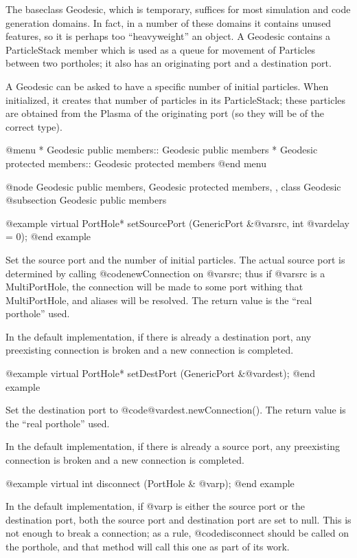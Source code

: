 The baseclass Geodesic, which is temporary, suffices for most simulation
and code generation domains.  In fact, in a number of these domains it
contains unused features, so it is perhaps too ``heavyweight'' an object.
A Geodesic contains a ParticleStack member which is used as a queue for
movement of Particles between two portholes; it also has an originating
port and a destination port.

A Geodesic can be asked to have a specific number of initial particles.
When initialized, it creates that number of particles in its
ParticleStack; these particles are obtained from the Plasma of the
originating port (so they will be of the correct type).

@menu
* Geodesic public members::  Geodesic public members
* Geodesic protected members::  Geodesic protected members
@end menu

@node Geodesic public members, Geodesic protected members,  , class Geodesic
@subsection Geodesic public members

@example
virtual PortHole* setSourcePort (GenericPort &@var{src}, int @var{delay} = 0);
@end example

Set the source port and the number of initial particles.  The actual
source port is determined by calling @code{newConnection} on @var{src};
thus if @var{src} is a MultiPortHole, the connection will be made to
some port withing that MultiPortHole, and aliases will be resolved.
The return value is the ``real porthole'' used.

In the default implementation, if there is already a destination port,
any preexisting connection is broken and a new connection is completed.


@example
virtual PortHole* setDestPort (GenericPort &@var{dest});
@end example

Set the destination port to @code{@var{dest}.newConnection()}.  The
return value is the ``real porthole'' used.

In the default implementation, if there is already a source port,
any preexisting connection is broken and a new connection is completed.

@example
virtual int disconnect (PortHole & @var{p});
@end example

In the default implementation, if @var{p} is either the source port or
the destination port, both the source port and destination port are set
to null.  This is not enough to break a connection; as a rule,
@code{disconnect} should be called on the porthole, and that method
will call this one as part of its work.

